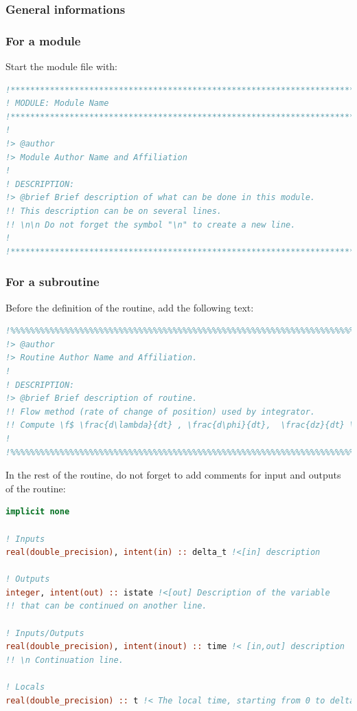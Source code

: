 \documentclass[english,a4paper,twoside]{article}
\begin{document}
\subsubsection{General informations}

\subsubsection{For a module}
Start the module file with:
\begin{lstlisting}[language=Fortran]
!******************************************************************************
! MODULE: Module Name
!******************************************************************************
!
!> @author
!> Module Author Name and Affiliation
!
! DESCRIPTION: 
!> @brief Brief description of what can be done in this module. 
!! This description can be on several lines. 
!! \n\n Do not forget the symbol "\n" to create a new line.
!
!******************************************************************************
\end{lstlisting}

\subsubsection{For a subroutine}
Before the definition of the routine, add the following text:
\begin{lstlisting}[language=Fortran]
!%%%%%%%%%%%%%%%%%%%%%%%%%%%%%%%%%%%%%%%%%%%%%%%%%%%%%%%%%%%%%%%%%%%%%%%%%%%
!> @author 
!> Routine Author Name and Affiliation.
!
! DESCRIPTION: 
!> @brief Brief description of routine. 
!! Flow method (rate of change of position) used by integrator.
!! Compute \f$ \frac{d\lambda}{dt} , \frac{d\phi}{dt},  \frac{dz}{dt} \f$ }
!
!%%%%%%%%%%%%%%%%%%%%%%%%%%%%%%%%%%%%%%%%%%%%%%%%%%%%%%%%%%%%%%%%%%%%%%%%%%% 
\end{lstlisting}

In the rest of the routine, do not forget to add comments for input and outputs of the routine: 
\begin{lstlisting}[language=Fortran]
implicit none

! Inputs
real(double_precision), intent(in) :: delta_t !<[in] description

! Outputs
integer, intent(out) :: istate !<[out] Description of the variable
!! that can be continued on another line.

! Inputs/Outputs
real(double_precision), intent(inout) :: time !< [in,out] description
!! \n Continuation line. 

! Locals
real(double_precision) :: t !< The local time, starting from 0 to delta_t
\end{lstlisting}
\end{document}

